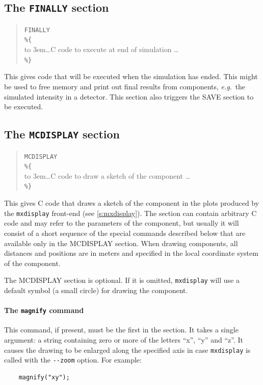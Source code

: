 \subsection{The \texttt{FINALLY} section}
\label{s:comp-finally}

\begin{quote}
  \texttt{FINALLY} \\
  \verb|%{| \\
  \hbox to 3em{}\ldots C code to execute at end of simulation \ldots \\
  \verb|%}|
\end{quote}
This gives code that will be executed when the simulation has
ended. This might be used to free memory and print out final results from components, \textit{e.g}.\ the
simulated intensity in a detector. This section also triggers the SAVE section to be executed.

\subsection{The \texttt{MCDISPLAY} section}
\label{s:comp-mcdisplay}

\begin{quote}
  \texttt{MCDISPLAY} \\
  \verb|%{| \\
  \hbox to 3em{}\ldots C code to draw a sketch of the component \ldots \\
  \verb|%}|
\end{quote}
This gives C code that draws a sketch of the component in the plots
produced by the \verb+mxdisplay+ front-end (see
\cref{s:mxdisplay}). The section can contain arbitrary C code and
may refer to the parameters of the component, but usually it will
consist of a short sequence of the special commands described below that
are available only in the MCDISPLAY section.
When drawing components, all distances and positions are in meters and
specified in the local coordinate system of the component.

The MCDISPLAY section is optional. If it is omitted, \verb+mxdisplay+
will use a default symbol (a small circle) for drawing the component.

\paragraph{The \texttt{magnify} command}

This command, if present, must be the first in the section. It takes a
single argument: a string containing zero or more of the letters ``x'',
``y'' and ``z''. It causes the drawing to be enlarged along the
specified axis in case \verb+mxdisplay+ is called with the \verb+--zoom+
option. For example:
\begin{verbatim}
    magnify("xy");
\end{verbatim}


